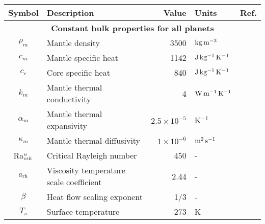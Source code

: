 \documentclass[trackchanges]{aastex63}
\begin{document}
\begin{table*}
\footnotesize
\begin{tabular}{@{} c l r l p{6cm} @{}}
\toprule
Symbol & Description & Value & Units & Ref. \\
\midrule
\multicolumn{5}{c}{\textbf{Constant bulk properties for all planets}} \\
$\rho_m$ & Mantle density & 3500 & $\rm{kg\,m^{-3}}$ &  \citet{thiriet_scaling_2019}  \\
$c_m$ & Mantle specific heat & 1142 & $\rm{J\,kg^{-1}\,K^{-1}}$ & \citet{thiriet_scaling_2019}  \\
$c_c$ & Core specific heat & 840 & $\rm{J\,kg^{-1}\,K^{-1}}$  & \citet{thiriet_scaling_2019}  \\
$k_m$ & Mantle thermal conductivity & 4 & $\rm{W\,m^{-1}\,K^{-1}}$ & \citet{thiriet_scaling_2019}  \\
$\alpha_m$ & Mantle thermal expansivity &  $2.5 \times 10^{-5}$ & K$^{-1}$  & \citet{thiriet_scaling_2019}  \\
$\kappa_m$ & Mantle thermal diffusivity &  $1 \times 10^{-6}$ & $\rm{m^{2}\,s^{-1}}$  & \citet{thiriet_scaling_2019}  \\
Ra$_{\rm crit}^{u}$ & Critical Rayleigh number & 450 & - & \citet{thiriet_scaling_2019}  \\
$a_{\rm rh}$ & Viscosity temperature scale coefficient & 2.44 & - & \citet{thiriet_scaling_2019} \\
$\beta$ & Heat flow scaling exponent & 1/3 & - & \citet{solomatov_scaling_1995} \\
$T_s$ & Surface temperature & 273 & K & \\


\end{tabular}
\end{table*}
\end{document}
